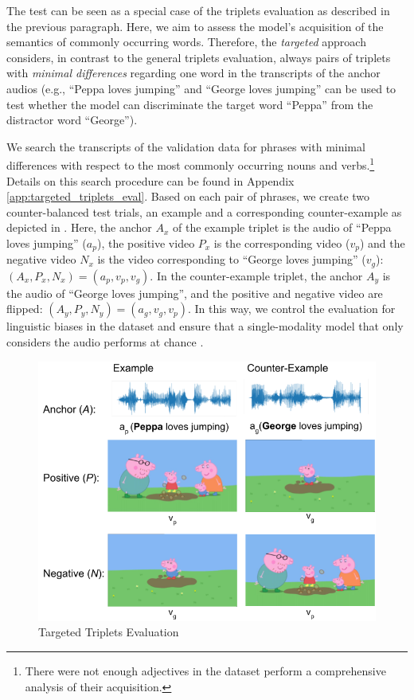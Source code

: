 The test can be seen as a special case of the triplets evaluation as
described in the previous paragraph. Here, we aim to assess the
model's acquisition of the semantics of commonly occurring
words. Therefore, the \textit{targeted} approach considers, in
contrast to the general triplets evaluation, always pairs of triplets
with \textit{minimal differences} regarding one word in the
transcripts of the anchor audios (e.g., ``Peppa loves jumping'' and
``George loves jumping'' can be used to test whether the model can
discriminate the target word ``Peppa'' from the distractor word
``George'').


We search the transcripts of the validation data for phrases with
minimal differences with respect to the most commonly occurring nouns
and verbs.\footnote{There were not enough adjectives in the dataset
  perform a comprehensive analysis of their acquisition.} Details on
this search procedure can be found in Appendix
\ref{app:targeted_triplets_eval}. Based on each pair of phrases, we
create two counter-balanced test trials, an example and a
corresponding counter-example as depicted in
. Here, the anchor $A_x$ of the example
triplet is the audio of ``Peppa loves jumping'' ($a_p$), the positive
video $P_x$ is the corresponding video ($v_p$) and the negative video
$N_x$ is the video corresponding to ``George loves jumping'' ($v_g$):
$(A_x, P_x, N_x) = (a_p, v_p, v_g)$.  In the counter-example triplet,
the anchor $A_y$ is the audio of ``George loves jumping'', and the
positive and negative video are flipped:
$(A_y, P_y, N_y) = (a_g, v_g, v_p)$. In this way, we control the
evaluation for linguistic biases in the dataset and ensure that a
single-modality model that only considers the audio performs at chance
\citep{nikolaus-fourtassi-2021-evaluating}.

\begin{figure}
  \centering
  \includegraphics[width=.7\linewidth]{peppa_targeted_triplets.png}
  \caption{Targeted Triplets Evaluation}
  \label{fig:targeted_triplets}
\end{figure}

